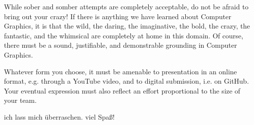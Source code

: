\documentclass[addpoints]{exam}
\begin{document}
While sober and somber attempts are completely acceptable, do not be afraid to bring out your crazy! If there is anything we have learned about Computer Graphics, it is that the wild, the daring, the imaginative, the bold, the crazy, the fantastic, and the whimsical are completely at home in this domain. Of course, there must be a sound, justifiable, and demonstrable grounding in Computer Graphics.

Whatever form you choose, it must be amenable to presentation in an online format, e.g. through a YouTube video, and to digital submission, i.e. on GitHub. Your eventual expression must also reflect an effort proportional to the size of your team.

ich lass mich \"uberraschen. viel Spa\ss!
\end{document}
